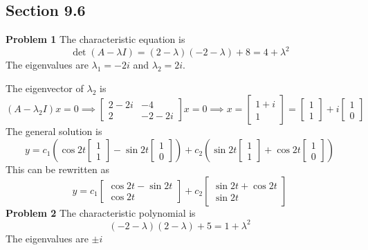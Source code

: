 \subsection*{Section 9.6}
\textbf{Problem 1}
The characteristic equation is 
\[
    \det(A-\lambda I)
    = (2-\lambda)(-2-\lambda) + 8
    = 4 + \lambda^2
\]
The eigenvalues are $\lambda_1 = -2i$ and $\lambda_2 = 2i$.

The eigenvector of $\lambda_2$ is 
\[
    (A-\lambda_2I)x=0 \implies 
    \begin{bmatrix}
        2-2i & -4 \\
        2 & -2-2i
    \end{bmatrix} x = 0 \implies
    x = 
    \begin{bmatrix}
        1+i \\ 1
    \end{bmatrix} = 
    \begin{bmatrix}
        1 \\ 1
    \end{bmatrix} +
    i
    \begin{bmatrix}
        1 \\ 0
    \end{bmatrix} 
\]
The general solution is 
\[
    y = c_1\left(\cos 2t \begin{bmatrix} 1 \\ 1 \end{bmatrix} 
          - \sin 2t \begin{bmatrix} 1 \\ 0 \end{bmatrix}\right) +
        c_2\left(\sin 2t \begin{bmatrix} 1 \\ 1 \end{bmatrix} 
          + \cos 2t \begin{bmatrix} 1 \\ 0 \end{bmatrix}\right) 
\]
This can be rewritten as 
\[
    y = c_1 
    \begin{bmatrix}
        \cos 2t - \sin 2t \\
        \cos 2t
    \end{bmatrix} +
    c_2 
    \begin{bmatrix}
        \sin 2t + \cos 2t \\
        \sin 2t
    \end{bmatrix}
\]
\textbf{Problem 2}
The characteristic polynomial is 
\[
    (-2-\lambda)(2-\lambda) + 5
    = 1 +\lambda^2
\]
The eigenvalues are $\pm i$
